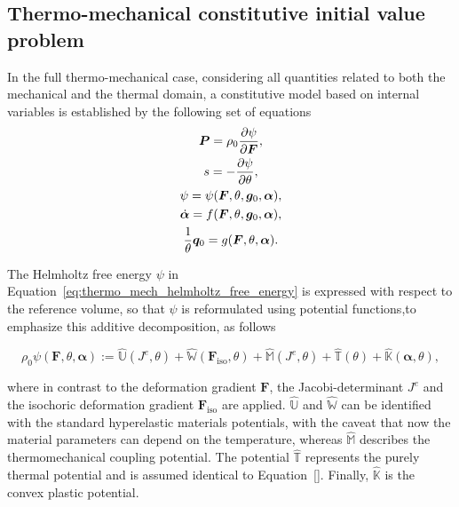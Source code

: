 \subsection{Thermo-mechanical constitutive initial value problem}

In the full thermo-mechanical case, considering all quantities related to both the mechanical and the thermal domain, a constitutive model based on internal variables is established by the following set of equations
    \begin{gather}
        \bm{P} = \rho_0 \frac{\partial \psi}{\partial \bm{F}},\\
        s = - \frac{\partial \psi}{\partial \theta},\\
        \psi = \psi(\bm{F},\theta, \bm g_0,\bm{\alpha}),\label{eq:thermo_mech_helmholtz_free_energy}\\
        \dot{\bm{\alpha}} = f(\bm{F}, \theta, \bm g_0,\bm{\alpha}),\\
        \frac{1}{\theta}\bm q_0 = g(\bm F, \theta, \bm \alpha).
    \end{gather}

The Helmholtz free energy \(\psi\) in Equation~\ref{eq:thermo_mech_helmholtz_free_energy} is expressed with respect to the reference volume, so that \(\psi\) is reformulated using potential functions,to emphasize this additive decomposition, as follows
  \begin{highlight}
    \begin{equation}
    \rho_{0} \psi\left(\bm{F}, \theta, \bm{\alpha}\right):=\hat{\mathbb{U}}\left(J^e,\theta\right)+\hat{\mathbb{W}}(\bm{F}_\text{iso},\theta)+\hat{\mathbb{M}}\left(J^e, \theta\right)+\hat{\mathbb{T}}(\theta)+\hat{\mathbb{K}}\left(\boldsymbol{\alpha}, \theta\right),
    \end{equation}
  \end{highlight}
  where in contrast to the deformation gradient \(\bm{F}\), the Jacobi-determinant \(J^{e}\) and the isochoric deformation gradient \(\bm{F}_\text{iso}\) are applied.
  \(\hat{\mathbb U}\) and \(\hat{\mathbb{W}}\) can be identified with the standard hyperelastic materials potentials, with the caveat that now the material parameters can depend on the temperature, whereas
  \(\hat{\mathbb M}\) describes the thermomechanical coupling potential.
  The potential \(\hat{\mathbb{T}}\) represents the purely thermal potential and is assumed identical to Equation~\eqref{}.
  Finally, \(\hat{\mathbb{K}}\) is the convex plastic potential.

